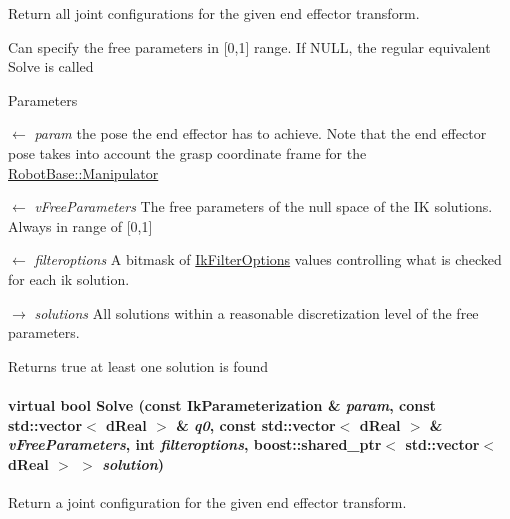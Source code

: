 Return all joint configurations for the given end effector transform. 

Can specify the free parameters in \mbox{[}0,1\mbox{]} range. If NULL, the regular equivalent Solve is called 
\begin{DoxyParams}{Parameters}
\item[\mbox{$\leftarrow$} {\em param}]the pose the end effector has to achieve. Note that the end effector pose takes into account the grasp coordinate frame for the \hyperlink{classOpenRAVE_1_1RobotBase_1_1Manipulator}{RobotBase::Manipulator} \item[\mbox{$\leftarrow$} {\em vFreeParameters}]The free parameters of the null space of the IK solutions. Always in range of \mbox{[}0,1\mbox{]} \item[\mbox{$\leftarrow$} {\em filteroptions}]A bitmask of \hyperlink{namespaceOpenRAVE_a89401ff7c557d6d1ede96b550fb22bdc}{IkFilterOptions} values controlling what is checked for each ik solution. \item[\mbox{$\rightarrow$} {\em solutions}]All solutions within a reasonable discretization level of the free parameters. \end{DoxyParams}
\begin{DoxyReturn}{Returns}
true at least one solution is found 
\end{DoxyReturn}
\hypertarget{classOpenRAVE_1_1IkSolverBase_a6fbb4a98f8ca339a41d7c746f397a664}{
\paragraph[{Solve}]{\setlength{\rightskip}{0pt plus 5cm}virtual bool Solve (const {\bf IkParameterization} \& {\em param}, \/  const std::vector$<$ dReal $>$ \& {\em q0}, \/  const std::vector$<$ dReal $>$ \& {\em vFreeParameters}, \/  int {\em filteroptions}, \/  boost::shared\_\-ptr$<$ std::vector$<$ dReal $>$ $>$ {\em solution})}\hfill}
\label{classOpenRAVE_1_1IkSolverBase_a6fbb4a98f8ca339a41d7c746f397a664}
Return a joint configuration for the given end effector transform.

